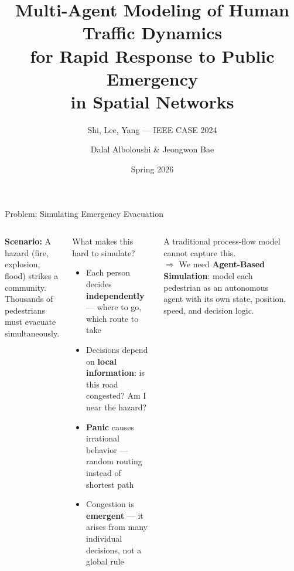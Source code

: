 \documentclass[aspectratio=169, xcolor=table]{beamer}
\title{Multi-Agent Modeling of Human Traffic Dynamics\\for Rapid Response to Public Emergency\\in Spatial Networks}
\subtitle{Shi, Lee, Yang --- IEEE CASE 2024}
\author{Dalal Alboloushi \quad \& \quad Jeongwon Bae}
\institute{IE 522 --- Simulation \\ Penn State University}
\date{Spring 2026}
\newcommand{\keyterm}[1]{\textbf{\textcolor{highlightblue}{#1}}}
\begin{document}
\begin{frame}[plain]
  \titlepage
\end{frame}

\begin{frame}[t,shrink=10]{Problem: Simulating Emergency Evacuation}
\small

\begin{columns}[T,onlytextwidth]

\textbf{Scenario:} A hazard (fire, explosion, flood) strikes a community.\\
Thousands of pedestrians must evacuate simultaneously.

\vspace{0.6em}
\begin{block}{What makes this hard to simulate?}
\footnotesize
\begin{itemize}\itemsep0.3em
  \item Each person decides \keyterm{independently} --- where to go, which route to take
  \item Decisions depend on \keyterm{local information}: is this road congested? Am I near the hazard?
  \item \keyterm{Panic} causes irrational behavior --- random routing instead of shortest path
  \item Congestion is \keyterm{emergent} --- it arises from many individual decisions, not a global rule
\end{itemize}
\end{block}

\vspace{0.3em}
\begin{alertblock}{}
\footnotesize
A traditional process-flow model cannot capture this.\\
$\Rightarrow$ We need \textbf{Agent-Based Simulation}: model each pedestrian as an autonomous agent with its own state, position, speed, and decision logic.
\end{alertblock}

\vspace{0.5em}
\begin{center}
\end{center}
\end{columns}
\end{frame}
\end{document}
